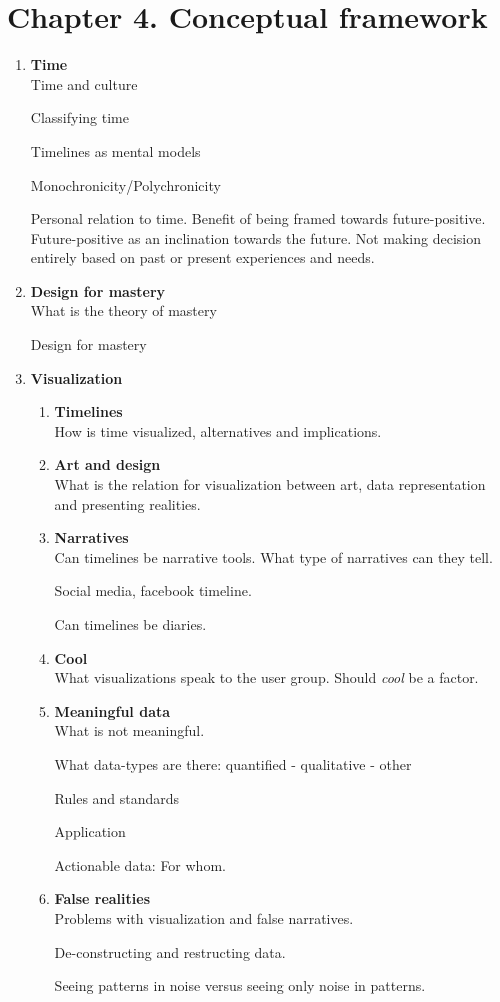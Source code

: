 \documentclass[11pt,UKenglish, a4paper]{article}
\begin{document}
\section{Chapter 4. Conceptual framework}
\begin{enumerate}[label=\bfseries\arabic*]

\item \textbf{Time}\hfill \\
Time and culture

Classifying time

Timelines as mental models

Monochronicity/Polychronicity

Personal relation to time.
Benefit of being framed towards future-positive. Future-positive as an inclination towards the future. Not making decision entirely based on past or present experiences and needs.
\item \textbf{Design for mastery} \hfill \\
What is the theory of mastery

Design for mastery
\item \textbf{Visualization}
	\begin{enumerate}[label=\bfseries\arabic*]
		\item \textbf{Timelines} \hfill \\
		How is time visualized, alternatives and implications.
		\item \textbf{Art and design} \hfill \\
		What is the relation for visualization between art, data representation and presenting realities.
		\item \textbf{Narratives} \hfill \\
		Can timelines be narrative tools. What type of narratives can they tell. 

		Social media, facebook timeline.

		Can timelines be diaries.
		\item \textbf{Cool} \hfill \\
		What visualizations speak to the user group. Should \textit{cool} be a factor. 
		\item \textbf{Meaningful data} \hfill \\
		What is not meaningful. 
	
		What data-types are there: quantified - qualitative - other

		Rules and standards
	
		Application

		Actionable data: For whom. 
		\item \textbf{False realities} \hfill \\
		Problems with visualization and false narratives. 

		De-constructing and restructing data.

		Seeing patterns in noise versus seeing only noise in patterns.

		\end{enumerate}
		\end{enumerate}
\end{document}
